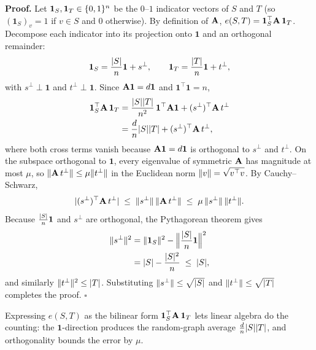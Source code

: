 \begin{whybox}
\textbf{Proof.} Let $\mathbf{1}_S,\mathbf{1}_T\in\{0,1\}^n$ be the $0$--$1$ indicator vectors of $S$ and $T$ (so $(\mathbf{1}_S)_v = 1$ if $v\in S$ and $0$ otherwise). By definition of $\mathbf{A}$, $e(S,T)=\mathbf{1}_S^\top\mathbf{A}\,\mathbf{1}_T$. Decompose each indicator into its projection onto $\mathbf{1}$ and an orthogonal remainder:
\[
  \mathbf{1}_S=\frac{\lvert S\rvert}{n}\mathbf{1} + s^\perp,\qquad \mathbf{1}_T=\frac{\lvert T\rvert}{n}\mathbf{1} + t^\perp,
\]
with $s^\perp\perp\mathbf{1}$ and $t^\perp\perp\mathbf{1}$. Since $\mathbf{A}\mathbf{1}=d\mathbf{1}$ and $\mathbf{1}^\top\mathbf{1}=n$,
\begin{align*}
  \mathbf{1}_S^\top\mathbf{A}\,\mathbf{1}_T
  &= \frac{\lvert S\rvert\lvert T\rvert}{n^2}\,\mathbf{1}^\top\mathbf{A}\mathbf{1} + (s^\perp)^\top\mathbf{A}\,t^\perp \\
  &= \frac{d}{n}\lvert S\rvert\lvert T\rvert + (s^\perp)^\top\mathbf{A}\,t^\perp,
\end{align*}
where both cross terms vanish because $\mathbf{A}\mathbf{1}=d\mathbf{1}$ is orthogonal to $s^\perp$ and $t^\perp$. On the subspace orthogonal to $\mathbf{1}$, every eigenvalue of symmetric $\mathbf{A}$ has magnitude at most $\mu$, so $\lVert\mathbf{A}\,t^\perp\rVert\le\mu\lVert t^\perp\rVert$ in the Euclidean norm $\lVert v\rVert=\sqrt{v^\top v}$. By Cauchy--Schwarz,
\[
  \lvert(s^\perp)^\top\mathbf{A}\,t^\perp\rvert\;\le\;\lVert s^\perp\rVert\,\lVert\mathbf{A}\,t^\perp\rVert\;\le\;\mu\,\lVert s^\perp\rVert\,\lVert t^\perp\rVert.
\]
Because $\frac{\lvert S\rvert}{n}\mathbf{1}$ and $s^\perp$ are orthogonal, the Pythagorean theorem gives
\begin{align*}
  \lVert s^\perp\rVert^2 &= \lVert\mathbf{1}_S\rVert^2 - \Bigl\lVert\frac{\lvert S\rvert}{n}\mathbf{1}\Bigr\rVert^2 \\
                   &= \lvert S\rvert - \frac{\lvert S\rvert^2}{n} \;\le\; \lvert S\rvert,
\end{align*}
and similarly $\lVert t^\perp\rVert^2\le\lvert T\rvert$. Substituting $\lVert s^\perp\rVert\le\sqrt{\lvert S\rvert}$ and $\lVert t^\perp\rVert\le\sqrt{\lvert T\rvert}$ completes the proof. \hfill$\square$
\end{whybox}

Expressing $e(S,T)$ as the bilinear form $\mathbf{1}_S^\top\mathbf{A}\,\mathbf{1}_T$ lets linear algebra do the counting: the $\mathbf{1}$-direction produces the random-graph average $\frac{d}{n}\lvert S\rvert\lvert T\rvert$, and orthogonality bounds the error by $\mu$.

